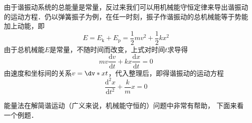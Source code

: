 

由于谐振动系统的总能量是常量，反过来我们可以用机械能守恒定律来导出谐振动的运动方程．仍以弹簧振子为例，在任一时刻，振子作谐振动的总机械能等于势能加上动能，即
\begin{equation}
E=E_{\mathrm k}+E_{\mathrm p}=\frac{1}{2} m v^{2}+\frac{1}{2} k x^{2}
\end{equation}
由于总机械能$E$是常量，不随时间而改变，上式对时间$t$求导得
\begin{equation}
m v \frac{\mathrm{d} v}{\mathrm{d} t}+k x \frac{\mathrm{d} x}{\mathrm{d} t}=0
\end{equation}
由速度和坐标间的关系$v = \dv*{x}{t}$，代入整理后，即得谐振动的运动方程
\begin{equation}
\frac{\mathrm{d}^{2} x}{\mathrm{d} t^{2}}+\frac{k}{m} x=0
\end{equation}

能量法在解简谐运动（广义来说，机械能守恒的）问题中非常有帮助， 下面来看一个例题． 

